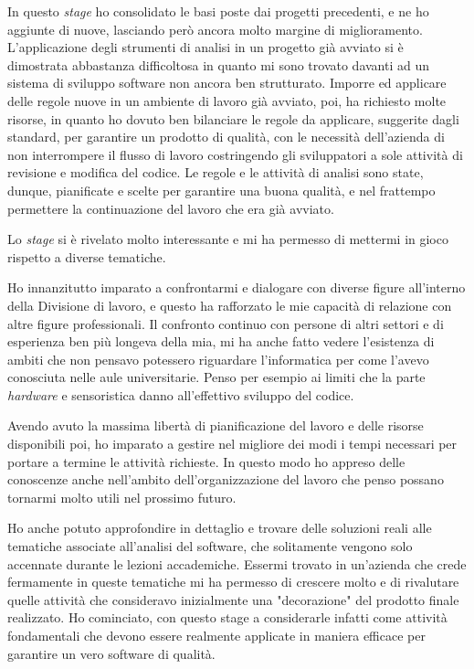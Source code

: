 In questo \textit{stage} ho consolidato le basi poste dai progetti precedenti, e ne ho aggiunte di nuove, lasciando però ancora molto margine di miglioramento. L'applicazione degli strumenti di analisi in un progetto già avviato si è dimostrata abbastanza difficoltosa in quanto mi sono trovato davanti ad un sistema di sviluppo software non ancora ben strutturato. Imporre ed applicare delle regole nuove in un ambiente di lavoro già avviato, poi, ha richiesto molte risorse, in quanto ho dovuto ben bilanciare le regole da applicare, suggerite dagli standard, per garantire un prodotto di qualità, con le necessità dell'azienda di non interrompere il flusso di lavoro costringendo gli sviluppatori a sole attività di revisione e modifica del codice. Le regole e le attività di analisi sono state, dunque, pianificate e scelte per garantire una buona qualità, e nel frattempo permettere la continuazione del lavoro che era già avviato.

\bigskip

Lo \textit{stage} si è rivelato molto interessante e mi ha permesso di mettermi in gioco rispetto a diverse tematiche.

Ho innanzitutto imparato a confrontarmi e dialogare con diverse figure all'interno della Divisione di lavoro, e questo ha rafforzato le mie capacità di relazione con altre figure professionali. Il confronto continuo con persone di altri settori e di esperienza ben più longeva della mia, mi ha anche fatto vedere l'esistenza di ambiti che non pensavo potessero riguardare l'informatica per come l'avevo conosciuta nelle aule universitarie. Penso per esempio ai limiti che la parte \textit{hardware} e sensoristica danno all'effettivo sviluppo del codice.

Avendo avuto la massima libertà di pianificazione del lavoro e delle risorse disponibili poi, ho imparato a gestire nel migliore dei modi i tempi necessari per portare a termine le attività richieste. In questo modo ho appreso delle conoscenze anche nell'ambito dell'organizzazione del lavoro che penso possano tornarmi molto utili nel prossimo futuro.

Ho anche potuto approfondire in dettaglio e trovare delle soluzioni reali alle tematiche associate all'analisi del software, che solitamente vengono solo accennate durante le lezioni accademiche. Essermi trovato in un'azienda che crede fermamente in queste tematiche mi ha permesso di crescere molto e di rivalutare quelle attività che consideravo inizialmente una "decorazione" del prodotto finale realizzato. Ho cominciato, con questo stage a considerarle infatti come attività fondamentali che devono essere realmente applicate in maniera efficace per garantire un vero software di qualità.

